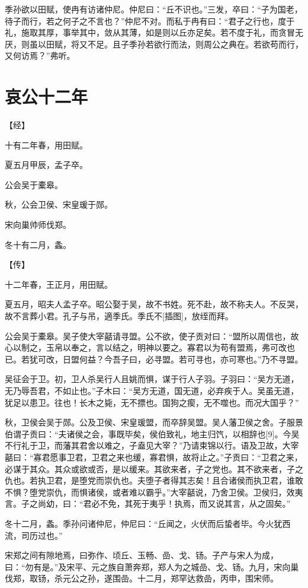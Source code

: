 \documentclass[a4paper,12pt,UTF8,twoside]{ctexbook}
\begin{document}
季孙欲以田赋，使冉有访诸仲尼。仲尼曰：“丘不识也。”三发，卒曰：“子为国老，待子而行，若之何子之不言也？”仲尼不对。而私于冉有曰：“君子之行也，度于礼，施取其厚，事举其中，敛从其薄，如是则以丘亦足矣。若不度于礼，而贪冒无厌，则虽以田赋，将又不足。且子季孙若欲行而法，则周公之典在。若欲苟而行，又何访焉？”弗听。


\section{哀公十二年}


【经】

十有二年春，用田赋。

夏五月甲辰，孟子卒。

公会吴于橐皋。

秋，公会卫侯、宋皇瑗于郧。

宋向巢帅师伐郑。

冬十有二月，螽。

【传】

十二年春，王正月，用田赋。

夏五月，昭夫人孟子卒。昭公娶于吴，故不书姓。死不赴，故不称夫人。不反哭，故不言葬小君。孔子与吊，適季氏。季氏不[插图]，放绖而拜。

公会吴于橐皋。吴子使大宰嚭请寻盟。公不欲，使子贡对曰：“盟所以周信也，故心以制之，玉帛以奉之，言以结之，明神以要之。寡君以为苟有盟焉，弗可改也已。若犹可改，日盟何益？今吾子曰，必寻盟。若可寻也，亦可寒也。”乃不寻盟。

吴征会于卫。初，卫人杀吴行人且姚而惧，谋于行人子羽。子羽曰：“吴方无道，无乃辱吾君，不如止也。”子木曰：“吴方无道，国无道，必弃疾于人。吴虽无道，犹足以患卫。往也！长木之毙，无不摽也。国狗之瘈，无不噬也。而况大国乎？”

秋，卫侯会吴于郧。公及卫侯、宋皇瑗盟，而卒辞吴盟。吴人藩卫侯之舍。子服景伯谓子贡曰：“夫诸侯之会，事既毕矣，侯伯致礼，地主归饩，以相辞也[9]。今吴不行礼于卫，而藩其君舍以难之，子盍见大宰？”乃请束锦以行。语及卫故，大宰嚭曰：“寡君愿事卫君，卫君之来也缓，寡君惧，故将止之。”子贡曰：“卫君之来，必谋于其众。其众或欲或否，是以缓来。其欲来者，子之党也。其不欲来者，子之仇也。若执卫君，是堕党而崇仇也。夫堕子者得其志矣！且合诸侯而执卫君，谁敢不惧？堕党崇仇，而惧诸侯，或者难以霸乎。”大宰嚭说，乃舍卫侯。卫侯归，效夷言。子之尚幼，曰：“君必不免，其死于夷乎！执焉，而又说其言，从之固矣。”

冬十二月，螽。季孙问诸仲尼，仲尼曰：“丘闻之，火伏而后蛰者毕。今火犹西流，司历过也。”

宋郑之间有隙地焉，曰弥作、顷丘、玉畅、嵒、戈、钖。子产与宋人为成，曰：“勿有是。”及宋平、元之族自萧奔郑，郑人为之城嵒、戈、钖。九月，宋向巢伐郑，取钖，杀元公之孙，遂围嵒。十二月，郑罕达救嵒，丙申，围宋师。
\end{document}
